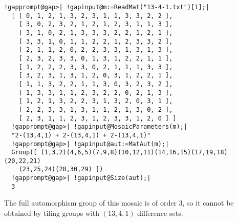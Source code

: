 \documentclass[a4paper,11pt]{report}
\begin{document}
{{\begin{Verbatim}[commandchars=!@|,fontsize=\small,frame=single,label=Example]
  !gapprompt@gap>| !gapinput@m:=ReadMat("13-4-1.txt")[1];|
  [ [ 0, 1, 2, 1, 3, 2, 3, 1, 1, 3, 3, 2, 2 ], 
    [ 3, 0, 2, 3, 2, 1, 2, 1, 2, 3, 1, 1, 3 ], 
    [ 3, 1, 0, 2, 1, 3, 3, 3, 2, 2, 1, 2, 1 ], 
    [ 3, 3, 1, 0, 1, 1, 2, 2, 1, 2, 3, 3, 2 ], 
    [ 2, 1, 1, 2, 0, 2, 2, 3, 3, 1, 3, 1, 3 ], 
    [ 2, 3, 2, 3, 3, 0, 1, 3, 1, 2, 2, 1, 1 ], 
    [ 1, 2, 2, 2, 3, 3, 0, 2, 1, 1, 1, 3, 3 ], 
    [ 3, 2, 3, 1, 3, 1, 2, 0, 3, 1, 2, 2, 1 ], 
    [ 1, 1, 3, 2, 2, 1, 1, 3, 0, 3, 2, 3, 2 ], 
    [ 1, 3, 3, 1, 1, 2, 3, 2, 2, 0, 2, 1, 3 ], 
    [ 1, 2, 1, 3, 2, 2, 3, 1, 3, 2, 0, 3, 1 ], 
    [ 2, 2, 3, 3, 1, 3, 1, 1, 2, 1, 3, 0, 2 ], 
    [ 2, 3, 1, 1, 2, 3, 1, 2, 3, 3, 1, 2, 0 ] ]
  !gapprompt@gap>| !gapinput@MosaicParameters(m);|
  "2-(13,4,1) + 2-(13,4,1) + 2-(13,4,1)"
  !gapprompt@gap>| !gapinput@aut:=MatAut(m);|
  Group([ (1,3,2)(4,6,5)(7,9,8)(10,12,11)(14,16,15)(17,19,18)(20,22,21)
    (23,25,24)(28,30,29) ])
  !gapprompt@gap>| !gapinput@Size(aut);|
  3
\end{Verbatim}
 The full automorphism group of this mosaic is of order $3$, so it cannot be obtained by tiling groups with $(13,4,1)$ difference sets. }

 }

  
\end{document}
